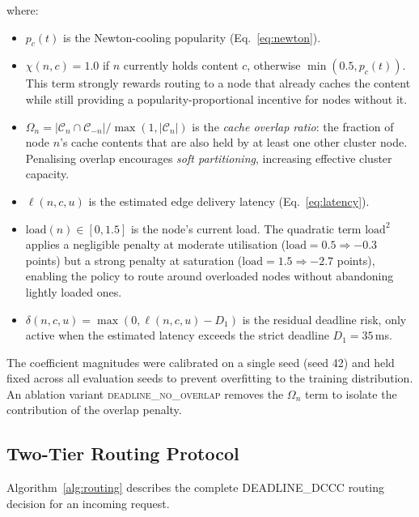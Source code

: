 \documentclass[conference]{IEEEtran}
\begin{document}
where:
\begin{itemize}
  \item $p_c(t)$ is the Newton-cooling popularity (Eq.~\ref{eq:newton}).
  \item $\chi(n,c) = 1.0$ if $n$ currently holds content $c$, otherwise
    $\min(0.5, p_c(t))$.  This term strongly rewards routing to a node
    that already caches the content while still providing a
    popularity-proportional incentive for nodes without it.
  \item $\Omega_n = |\mathcal{C}_n \cap \mathcal{C}_{-n}| /
    \max(1, |\mathcal{C}_n|)$ is the \emph{cache overlap ratio}: the
    fraction of node $n$'s cache contents that are also held by at
    least one other cluster node.  Penalising overlap encourages
    \emph{soft partitioning}, increasing effective cluster capacity.
  \item $\ell(n, c, u)$ is the estimated edge delivery latency
    (Eq.~\ref{eq:latency}).
  \item $\mathrm{load}(n) \in [0, 1.5]$ is the node's current load.
    The quadratic term $\mathrm{load}^2$ applies a negligible penalty
    at moderate utilisation ($\mathrm{load}=0.5 \Rightarrow -0.3$
    points) but a strong penalty at saturation ($\mathrm{load}=1.5
    \Rightarrow -2.7$ points), enabling the policy to route around
    overloaded nodes without abandoning lightly loaded ones.
  \item $\delta(n,c,u) = \max(0, \ell(n,c,u) - D_1)$ is the residual
    deadline risk, only active when the estimated latency exceeds the
    strict deadline $D_1 = 35$\,ms.
\end{itemize}

The coefficient magnitudes were calibrated on a single seed (seed 42)
and held fixed across all evaluation seeds to prevent overfitting to
the training distribution.  An ablation variant \textsc{deadline\_no\_overlap}
removes the $\Omega_n$ term to isolate the contribution of the
overlap penalty.

\subsection{Two-Tier Routing Protocol}

Algorithm~\ref{alg:routing} describes the complete DEADLINE\_DCCC
routing decision for an incoming request.
\end{document}
